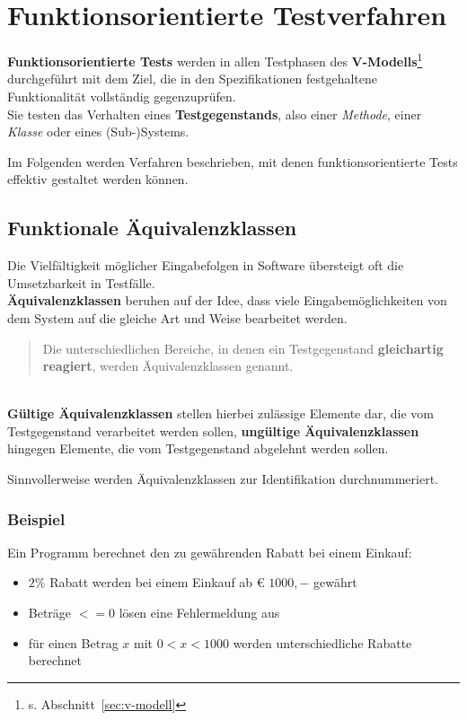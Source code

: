 \section{Funktionsorientierte Testverfahren}

\begin{tcolorbox}
    \textbf{Funktionsorientierte Tests} werden in allen Testphasen des \textbf{V-Modells}\footnote{s. Abschnitt~\ref{sec:v-modell}} durchgeführt mit dem Ziel, die in den Spezifikationen festgehaltene  Funktionalität vollständig gegenzuprüfen.\\
    Sie testen das Verhalten eines \textbf{Testgegenstands}, also einer \textit{Methode}, einer \textit{Klasse} oder eines (Sub-)Systems.
\end{tcolorbox}
\vspace{2mm}

\noindent
Im Folgenden werden Verfahren beschrieben, mit denen funktionsorientierte Tests effektiv gestaltet werden können.

\subsection{Funktionale Äquivalenzklassen}\label{subsec:funktionale-aquivalenzklassen}
Die Vielfältigkeit möglicher Eingabefolgen in Software übersteigt oft die Umsetzbarkeit in Testfälle.\\
\textbf{Äquivalenzklassen} beruhen auf der Idee, dass viele Eingabemöglichkeiten von dem System auf die gleiche Art und Weise bearbeitet werden.

\begin{tcolorbox}[title=Äquivalenzklassen]
    \blockquote[{\cite[43]{Wed09c}}]{
    Die unterschiedlichen Bereiche, in denen ein Testgegenstand \textbf{gleichartig reagiert}, werden Äquivalenzklassen genannt.
    }\\
    \textbf{Gültige Äquivalenzklassen} stellen hierbei zulässige Elemente dar, die vom Testgegenstand verarbeitet werden sollen, \textbf{ungültige Äquivalenzklassen} hingegen Elemente, die vom Testgegenstand abgelehnt werden sollen.
\end{tcolorbox}

\noindent
Sinnvollerweise werden Äquivalenzklassen zur Identifikation durchnummeriert.

\subsubsection*{Beispiel}
Ein Programm berechnet den zu gewährenden Rabatt bei einem Einkauf:
\begin{itemize}
    \item $2\%$ Rabatt werden bei einem Einkauf ab € $1000,-$ gewährt
    \item Beträge $<= 0$ lösen eine Fehlermeldung aus
    \item für einen Betrag $x$ mit $0 < x < 1000$ werden unterschiedliche Rabatte berechnet
\end{itemize}

